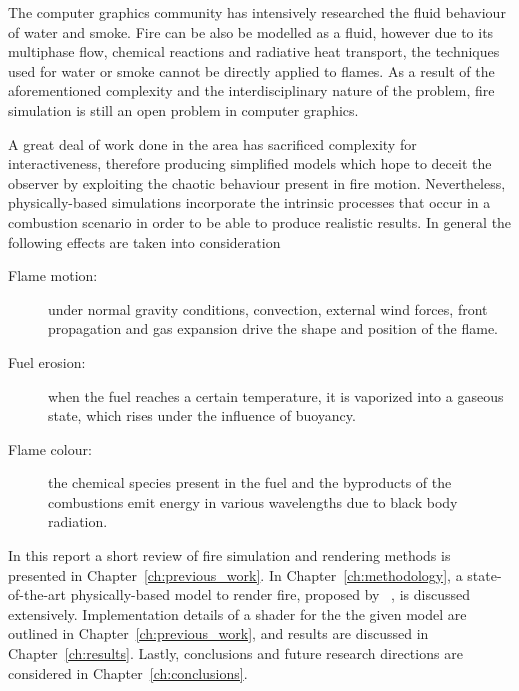 The computer graphics community has intensively researched the fluid behaviour of water and smoke.
Fire can be also be modelled as a fluid, however due to its multiphase flow, chemical reactions and radiative heat transport, the techniques used for water or smoke cannot be directly applied to flames.
As a result of the aforementioned complexity and the interdisciplinary nature of the problem, fire simulation is still an open problem in computer graphics.

A great deal of work done in the area has sacrificed complexity for interactiveness, therefore producing simplified models which hope to deceit the observer by exploiting the chaotic behaviour present in fire motion.
Nevertheless, physically-based simulations incorporate the intrinsic processes that occur in a combustion scenario in order to be able to produce realistic results.
In general the following effects are taken into consideration

\begin{description}
\item[Flame motion:] under normal gravity conditions, convection, external wind forces, front propagation and gas expansion drive the shape and position of the flame. 
\item[Fuel erosion:] when the fuel reaches a certain temperature, it is vaporized into a gaseous state, which rises under the influence of buoyancy.
\item[Flame colour:] the chemical species present in the fuel and the byproducts of the combustions emit energy in various wavelengths due to black body radiation.
\end{description}

In this report a short review of fire simulation and rendering methods is presented in Chapter~\ref{ch:previous_work}.
In Chapter~\ref{ch:methodology}, a state-of-the-art physically-based model to render fire, proposed by ~\cite{Pegoraro:2006}, is discussed extensively.
Implementation details of a \MentalRay shader for the the given model are outlined in Chapter~\ref{ch:previous_work}, and results are discussed in Chapter~\ref{ch:results}.
Lastly, conclusions and future research directions are considered in Chapter~\ref{ch:conclusions}.